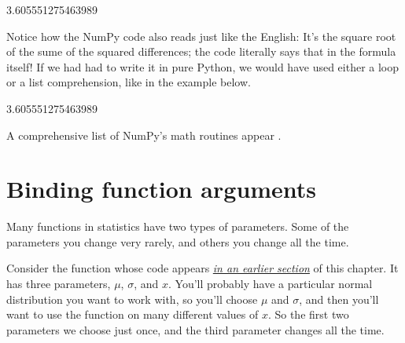 \documentclass[letterpaper,10pt,english]{jupyterBook}
\begin{document}
\begin{sphinxVerbatim}[commandchars=\\\{\}]
3.605551275463989
\end{sphinxVerbatim}

\sphinxAtStartPar
Notice how the NumPy code also reads just like the English:  It’s the square root of the sume of the squared differences; the code literally says that in the formula itself!  If we had had to write it in pure Python, we would have used either a loop or a list comprehension, like in the example below.

\begin{sphinxVerbatim}[commandchars=\\\{\}]
    \PYG{p}{[}  \PYG{p}{[}\PYG{p}{]}  \PYG{p}{[}\PYG{p}{]}      \PYG{p}{]}   
\end{sphinxVerbatim}

\begin{sphinxVerbatim}[commandchars=\\\{\}]
3.605551275463989
\end{sphinxVerbatim}

\sphinxAtStartPar
A comprehensive list of NumPy’s math routines appear .


\section{Binding function arguments}
\label{\detokenize{chapter-9-math-and-stats:binding-function-arguments}}
\sphinxAtStartPar
Many functions in statistics have two types of parameters.  Some of the parameters you change very rarely, and others you change all the time.

\sphinxAtStartPar
{}  Consider the  function whose code appears {\hyperref[\detokenize{chapter-9-math-and-stats:naming-mathematical-variables}]{\emph{in an earlier section}}} of this chapter.  It has three parameters, \(\mu\), \(\sigma\), and \(x\).  You’ll probably have a particular normal distribution you want to work with, so you’ll choose \(\mu\) and \(\sigma\), and then you’ll want to use the function on many different values of \(x\).  So the first two parameters we choose just once, and the third parameter changes all the time.
\end{document}

